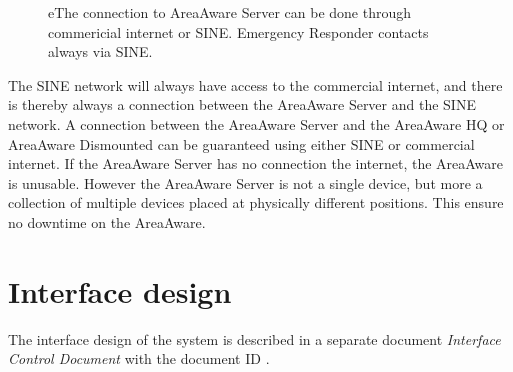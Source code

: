     \begin{figure}[ht]
        \centering
        \quad\quad
        \quad\quad
        \caption{eThe connection to AreaAware Server can be done through commericial internet or SINE. Emergency Responder contacts always via SINE.}
        \label{fig:ce}
    \end{figure}

The SINE network will always have access to the commercial internet, and there is thereby always a connection between the AreaAware Server and the SINE network.
A connection between the AreaAware Server and the AreaAware HQ or AreaAware Dismounted can be guaranteed using either SINE or commercial internet.
If the AreaAware Server has no connection the internet, the AreaAware is unusable.
However the AreaAware Server is not a single device, but more a collection of multiple devices placed at physically different positions.
This ensure no downtime on the AreaAware.


\section{Interface design}
\label{sec:arch_interface}
The interface design of the system is described in a separate document \emph{Interface Control Document} with the document ID \icd.

